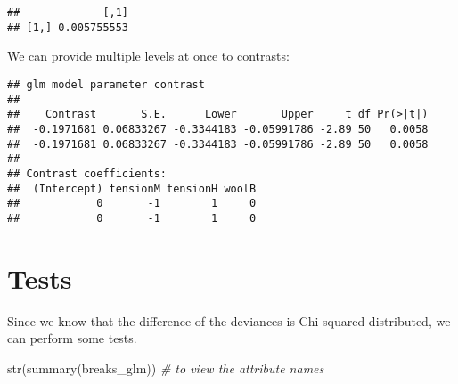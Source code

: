 \documentclass[
  oneside]{book}
\newenvironment{Shaded}{\begin{snugshade}}{\end{snugshade}}
\newcommand{\AttributeTok}[1]{\textcolor[rgb]{0.77,0.63,0.00}{#1}}
\newcommand{\CommentTok}[1]{\textcolor[rgb]{0.56,0.35,0.01}{\textit{#1}}}
\newcommand{\ConstantTok}[1]{\textcolor[rgb]{0.00,0.00,0.00}{#1}}
\newcommand{\FunctionTok}[1]{\textcolor[rgb]{0.00,0.00,0.00}{#1}}
\newcommand{\NormalTok}[1]{#1}
\newcommand{\OtherTok}[1]{\textcolor[rgb]{0.56,0.35,0.01}{#1}}
\newcommand{\SpecialCharTok}[1]{\textcolor[rgb]{0.00,0.00,0.00}{#1}}
\newcommand{\StringTok}[1]{\textcolor[rgb]{0.31,0.60,0.02}{#1}}
\begin{document}
\begin{verbatim}
##             [,1]
## [1,] 0.005755553
\end{verbatim}

We can provide multiple levels at once to contrasts:

\begin{Shaded}
\end{Shaded}

\begin{verbatim}
## glm model parameter contrast
## 
##    Contrast       S.E.      Lower       Upper     t df Pr(>|t|)
##  -0.1971681 0.06833267 -0.3344183 -0.05991786 -2.89 50   0.0058
##  -0.1971681 0.06833267 -0.3344183 -0.05991786 -2.89 50   0.0058
## 
## Contrast coefficients:
##  (Intercept) tensionM tensionH woolB
##            0       -1        1     0
##            0       -1        1     0
\end{verbatim}

\hypertarget{tests}{%
\section{Tests}\label{tests}}

Since we know that the difference of the deviances
is Chi-squared distributed, we can perform some tests.

\begin{Shaded}
\begin{Highlighting}[]
\FunctionTok{str}\NormalTok{(}\FunctionTok{summary}\NormalTok{(breaks\_glm)) }\CommentTok{\# to view the attribute names}
\end{Highlighting}
\end{Shaded}
\end{document}

